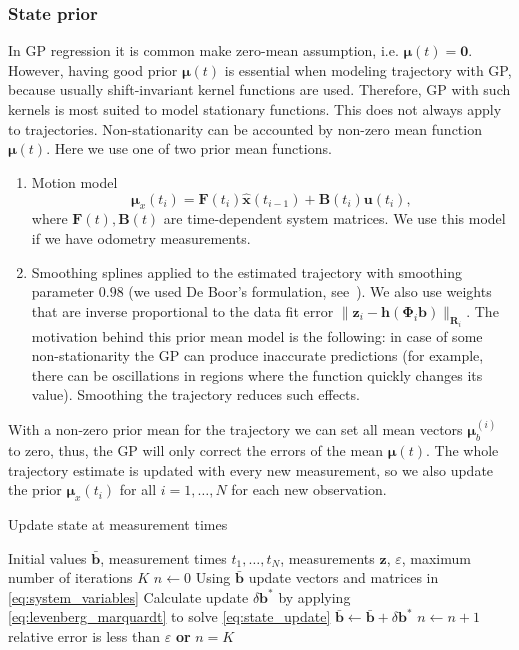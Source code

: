 \subsubsection{State prior}
In GP regression it is common make zero-mean assumption,
i.e. ${\bm \mu}(t) = {\bm 0}$.
However, having good prior ${\bm \mu}(t)$ is essential
when modeling trajectory with GP, because usually
shift-invariant kernel functions are used.
Therefore, GP with such kernels is most suited to model
stationary functions.
This does not always apply to trajectories.
Non-stationarity can be accounted by non-zero mean function
${\bm \mu}(t)$.
Here we use one of two prior mean functions.
\begin{enumerate}
    \item Motion model
    \[
        \bm{\mu}_x(t_i) = \mathbf{F}(t_i) \hat{\bm{x}}(t_{i - 1}) + \mathbf{B}(t_i) \bm{u}(t_i),
    \]
    where $\mathbf{F}(t), \mathbf{B}(t)$ are time-dependent
    system matrices.
    We use this model if we have odometry measurements.
    \item Smoothing splines applied to the estimated
    trajectory with smoothing parameter $0.98$
    (we used De Boor's formulation,
    see~\cite{bde2001practical}).
    We also use weights that are inverse proportional to the
    data fit error $\|{\bm z}_i - {\bm h}({\bm \Phi}_i {\bm b})\|_{\mathbf{R}_i}$.
    The motivation behind this prior mean model is the following:
    in case of some non-stationarity the GP can produce inaccurate predictions
    (for example, there can be oscillations in regions where the function quickly changes its value).
    Smoothing the trajectory reduces such effects.
\end{enumerate}
With a non-zero prior mean for the trajectory we can set
all mean vectors ${\bm \mu}_b^{(i)}$ to zero,
thus, the GP will only correct the errors of the mean
${\bm \mu}(t)$.
The whole trajectory estimate is updated with every new measurement,
so we also update the prior
$\bm{\mu}_x(t_i)$ for all $i=1, \ldots, N$
for each new observation.


\begin{algorithm}
\caption{Update state at measurement times}
\label{alg:state_update}
    \begin{algorithmic}[1]
        \State Initial values $\bar{\bm{b}}$, measurement times $t_1, \ldots, t_N$, measurements $\mathbf{z}$, $\varepsilon$, maximum number of iterations $K$
        \State $n \gets 0$
        \Repeat
            \State Using $\bar{\bm{b}}$ update vectors and matrices in \eqref{eq:system_variables}
            \State Calculate update $\delta \bm{b}^*$ by
            applying \eqref{eq:levenberg_marquardt} to solve \eqref{eq:state_update}
            \State $\bar{\bm{b}} \gets \bar{\bm{b}} + \delta \bm{b}^*$
            \State $n \gets n + 1$
        \Until relative error is less than $\varepsilon$ \textbf{or} $n = K$
    \end{algorithmic}
\end{algorithm}

